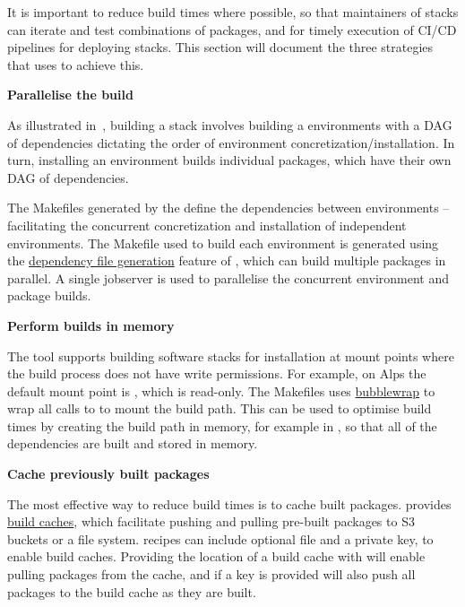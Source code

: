 It is important to reduce build times where possible, so that maintainers of stacks can iterate and test combinations of packages, and for timely execution of CI/CD pipelines for deploying stacks.
This section will document the three strategies that \stackinator uses to achieve this.

\noindent\textbf{Parallelise the build}

As illustrated in~, building a \spack stack involves building a \spack environments with a DAG of dependencies dictating the order of environment concretization/installation.
In turn, installing an environment builds individual packages, which have their own DAG of dependencies.

The Makefiles generated by the \stackinator define the dependencies between environments -- facilitating the concurrent concretization and installation of independent environments. The Makefile used to build each environment is generated using the
\href{https://spack.readthedocs.io/en/latest/environments.html#generating-depfiles-from-environments}{dependency file generation}
feature of \spack, which can build multiple packages in parallel.
A single jobserver is used to parallelise the concurrent environment and package builds.

\noindent\textbf{Perform builds in memory}

The \stackinator tool supports building software stacks for installation at mount points where the build process does not have write permissions.
For example, on Alps the default mount point is , which is read-only.
The Makefiles uses \href{https://github.com/containers/bubblewrap}{bubblewrap} to wrap all calls to \spack to mount the build path.
This can be used to optimise build times by creating the build path in memory, for example in , so that all of the dependencies are built and stored in memory.

\noindent\textbf{Cache previously built packages}

The most effective way to reduce build times is to cache built packages.
\spack provides \href{https://spack.readthedocs.io/en/latest/binary_caches.html}{build caches}, which facilitate pushing and pulling pre-built packages to S3 buckets or a file system.
\stackinator recipes can include optional  file and a private key, to enable build caches.
Providing the location of a build cache with  will enable pulling packages from the cache, and if a key is provided \stackinator will also push all packages to the build cache as they are built.


